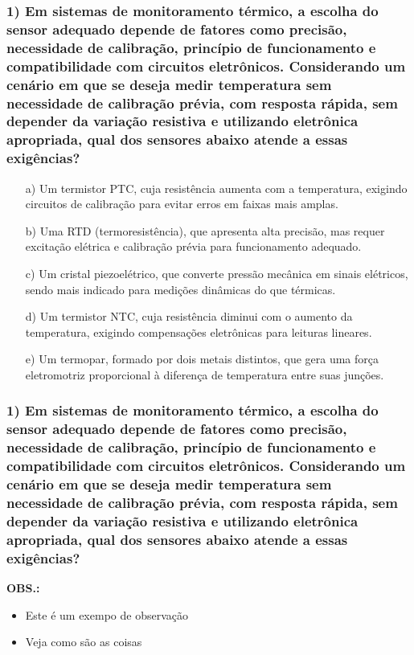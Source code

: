 \documentclass[12pt]{beamer}
\begin{document}
\begin{frame}
\frametitle{1) Em sistemas de monitoramento térmico, a escolha do sensor adequado depende de fatores como precisão, necessidade de calibração, princípio de funcionamento e compatibilidade com circuitos eletrônicos. Considerando um cenário em que se deseja medir temperatura sem necessidade de calibração prévia, com resposta rápida, sem depender da variação resistiva e utilizando eletrônica apropriada, qual dos sensores abaixo atende a essas exigências?}
{\BodySize
\begin{itemize}
\item[a)] Um termistor PTC, cuja resistência aumenta com a temperatura, exigindo circuitos de calibração para evitar erros em faixas mais amplas.
\item[b)] Uma RTD (termoresistência), que apresenta alta precisão, mas requer excitação elétrica e calibração prévia para funcionamento adequado.
\item[c)] Um cristal piezoelétrico, que converte pressão mecânica em sinais elétricos, sendo mais indicado para medições dinâmicas do que térmicas.
\item[d)] Um termistor NTC, cuja resistência diminui com o aumento da temperatura, exigindo compensações eletrônicas para leituras lineares.
\item[e)] \alert{Um termopar, formado por dois metais distintos, que gera uma força eletromotriz proporcional à diferença de temperatura entre suas junções.}
\end{itemize}
}
\end{frame}

\begin{frame}
\frametitle{1) Em sistemas de monitoramento térmico, a escolha do sensor adequado depende de fatores como precisão, necessidade de calibração, princípio de funcionamento e compatibilidade com circuitos eletrônicos. Considerando um cenário em que se deseja medir temperatura sem necessidade de calibração prévia, com resposta rápida, sem depender da variação resistiva e utilizando eletrônica apropriada, qual dos sensores abaixo atende a essas exigências?}
{\BodySize
\textbf{OBS.:}
\begin{itemize}
\item Este é um exempo de observação
\item Veja como são as coisas
\end{itemize}
}
\end{frame}
\end{document}
